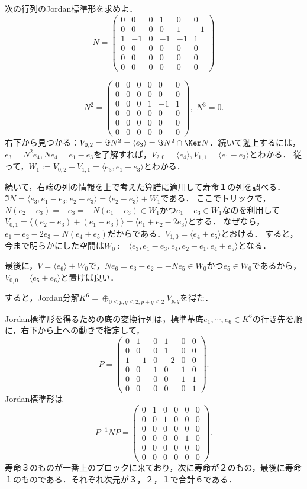 \documentclass[uplatex, dvipdfmx]{jsreport}
\begin{document}
\begin{problem}
    次の行列のJordan標準形を求めよ．
    \[N=\begin{pmatrix}0&0&0&1&0&0\\0&0&0&0&1&-1\\1&-1&0&-1&-1&1\\0&0&0&0&0&0\\0&0&0&0&0&0\\0&0&0&0&0&0\end{pmatrix}\]
\end{problem}
\begin{Proof}[［解答］]
    \[N^2=\begin{pmatrix}0&0&0&0&0&0\\0&0&0&0&0&0\\0&0&0&1&-1&1\\0&0&0&0&0&0\\0&0&0&0&0&0\\0&0&0&0&0&0\end{pmatrix},\;N^3=0.\]
    右下から見つかる：$V_{0,2}=\Im N^2=\langle e_3\rangle=\Im N^2\cap\Ker N$．続いて遡上するには，$e_3=N^2e_4,Ne_4=e_1-e_3$を了解すれば，$V_{2,0}=\langle  e_4\rangle,V_{1,1}=\langle e_1-e_3\rangle$とわかる．
    従って，$W_1:=V_{0,2}+V_{1,1}=\langle e_3,e_1-e_3\rangle$とわかる．

    続いて，右端の列の情報を上で考えた算譜に適用して寿命１の列を調べる．
    $\Im N=\langle  e_3,e_1-e_3,e_2-e_3\rangle=\langle e_2-e_3\rangle+W_1$である．
    ここでトリックで，$N(e_2-e_3)=-e_3=-N(e_1-e_3)\in W_1$かつ$e_1-e_3\in W_1$なのを利用して$V_{0,1}=\langle (e_2-e_3)+(e_1-e_3)\rangle =\langle e_1+e_2-2e_3\rangle$とする．
    なぜなら，$e_1+e_2-2e_3=N(e_4+e_5)$だからである．$V_{1,0}=\langle e_4+e_5\rangle$とおける．
    すると，今まで明らかにした空間は$W_0:=\langle e_3,e_1-e_3,e_4,e_2-e_1,e_4+e_5\rangle$となる．

    最後に，$V=\langle e_6\rangle +W_0$で，$Ne_6=e_3-e_2=-Ne_5\in W_0$かつ$e_5\in W_0$であるから，$V_{0,0}=\langle e_5+e_6\rangle$と置けば良い．

    すると，Jordan分解$K^6=\oplus_{0\le p,q\le 2,p+q\le 2}V_{p,q}$を得た．

    Jordan標準形を得るための底の変換行列は，標準基底$e_1,\cdots,e_6\in K^6$の行き先を順に，右下から上への動きで指定して，
    \[ P=\begin{pmatrix}0&1&0&1&0&0\\0&0&0&1&0&0\\1&-1&0&-2&0&0\\0&0&1&0&1&0\\0&0&0&0&1&1\\0&0&0&0&0&1\end{pmatrix}. \]
    Jordan標準形は
    \[ P^{-1}NP=\begin{pmatrix}0&1&0&0&0&0\\0&0&1&0&0&0\\0&0&0&0&0&0\\0&0&0&0&1&0\\0&0&0&0&0&0\\0&0&0&0&0&0\end{pmatrix}. \]
    寿命３のものが一番上のブロックに来ており，次に寿命が２のもの，最後に寿命１のものである．それぞれ次元が３，２，１で合計６である．
\end{Proof}
\end{document}
